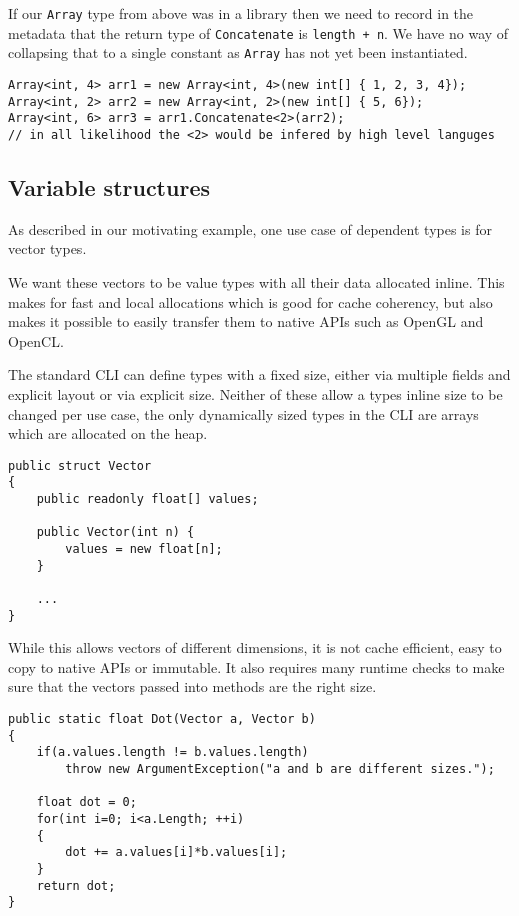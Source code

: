 If our \texttt{Array} type from above was in a library then we need to record in the metadata that the return type
of \texttt{Concatenate} is \texttt{length + n}. We have no way of collapsing that to a single constant as \texttt{Array}
has not yet been instantiated.

\begin{lstlisting}[caption={Using Array},keywordstyle={\color{blue}},language=sharpc]
Array<int, 4> arr1 = new Array<int, 4>(new int[] { 1, 2, 3, 4});
Array<int, 2> arr2 = new Array<int, 2>(new int[] { 5, 6});
Array<int, 6> arr3 = arr1.Concatenate<2>(arr2); 
// in all likelihood the <2> would be infered by high level languges
\end{lstlisting}


\subsection{Variable structures}

As described in our motivating example, one use case of dependent types is for vector types.

We want these vectors to be value types with all their data allocated inline. This makes for fast and local
allocations which is good for cache coherency, but also makes it possible to easily transfer them to native
APIs such as OpenGL and OpenCL.

The standard CLI can define types with a fixed size, either via multiple fields and explicit layout or via explicit size.
Neither of these allow a types inline size to be changed per use case, the only dynamically sized types in the CLI are
arrays which are allocated on the heap.

\begin{lstlisting}[caption={Vector using CLI array}, keywordstyle={\color{blue}},language=sharpc]
public struct Vector
{
	public readonly float[] values;
	
	public Vector(int n) {
		values = new float[n];
	}
	
	...
}
\end{lstlisting}

While this allows vectors of different dimensions, it is not cache efficient, easy to copy to native APIs or immutable.
It also requires many runtime checks to make sure that the vectors passed into methods are the right size.

\begin{lstlisting}[caption={Runtime checks needed when using arrays}, keywordstyle={\color{blue}},language=sharpc]
public static float Dot(Vector a, Vector b)
{
	if(a.values.length != b.values.length)
		throw new ArgumentException("a and b are different sizes.");
		
	float dot = 0;
	for(int i=0; i<a.Length; ++i)
	{
		dot += a.values[i]*b.values[i];
	}
	return dot;
}
\end{lstlisting}

